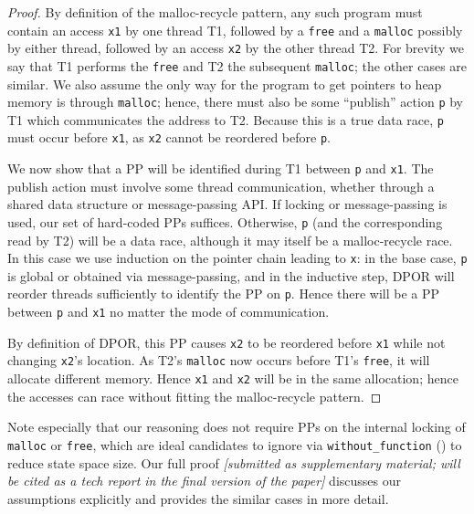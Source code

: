\begin{proof}
By definition of the malloc-recycle pattern,
any such program must contain an access {\tt x1} by one thread T1,
followed by a {\tt free} and a {\tt malloc} possibly by either thread,
followed by an access {\tt x2} by the other thread T2. %
For brevity we say that T1 performs the {\tt free} and T2 the subsequent {\tt malloc}; the other cases are similar.
We also assume the only way for the program to get pointers to heap memory is through {\tt malloc};
hence, there must also be some ``publish'' action {\tt p} by T1 which communicates the address to T2.
Because this is a true data race, {\tt p} must occur before {\tt x1}, as {\tt x2} cannot be reordered before {\tt p}.

We now show that a PP will be identified during T1 between {\tt p} and {\tt x1}.
The publish action must involve some thread communication, whether through a shared data structure or message-passing API.
If locking or message-passing is used, our set of hard-coded PPs suffices.
Otherwise, {\tt p} (and the corresponding read by T2) will be a data race, although it may itself be a malloc-recycle race.
In this case we use induction on the pointer chain leading to {\tt x}:
in the base case, {\tt p} is global or obtained via message-passing,
and in the inductive step, DPOR will reorder threads sufficiently to identify the PP on {\tt p}.
Hence there will be a PP between {\tt p} and {\tt x1} no matter the mode of communication.

By definition of DPOR, this PP causes {\tt x2} to be reordered before {\tt x1} while not changing {\tt x2}'s location.
As T2's {\tt malloc} now occurs before T1's {\tt free}, it will allocate different memory.
Hence {\tt x1} and {\tt x2} will be in the same allocation;
hence the accesses can race without fitting the malloc-recycle pattern.
\end{proof}

Note especially that our reasoning does not require PPs on the internal locking of {\tt malloc} or {\tt free},
which are ideal candidates to ignore via {\tt without\_function} (\sect{\ref{sec:landslide}}) to reduce state space size.
Our full proof
{\em [submitted as supplementary material; will be cited as a tech report in the final version of the paper]}
discusses our assumptions explicitly and provides the similar cases in more detail.
\renewcommand\proofname{Proof}

